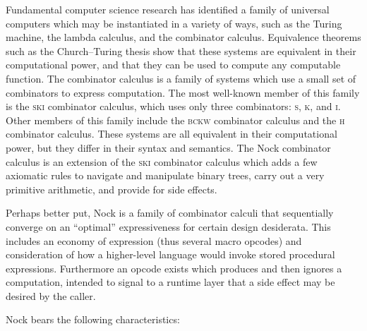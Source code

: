 \documentclass[twoside]{article}
\begin{document}
Fundamental computer science research has identified a family of universal computers which may be instantiated in a variety of ways, such as the Turing machine, the lambda calculus, and the combinator calculus.  Equivalence theorems such as the Church–Turing thesis show that these systems are equivalent in their computational power, and that they can be used to compute any computable function.  The combinator calculus is a family of systems which use a small set of combinators to express computation.  The most well-known member of this family is the \textsc{ski} combinator calculus, which uses only three combinators: \textsc{s}, \textsc{k}, and \textsc{i}.  Other members of this family include the \textsc{bckw} combinator calculus and the \textsc{h} combinator calculus.  These systems are all equivalent in their computational power, but they differ in their syntax and semantics.  The Nock combinator calculus is an extension of the \textsc{ski} combinator calculus which adds a few axiomatic rules to navigate and manipulate binary trees, carry out a very primitive arithmetic, and provide for side effects.

Perhaps better put, Nock is a family of combinator calculi that sequentially converge on an ``optimal'' expressiveness for certain design desiderata.  This includes an economy of expression (thus several macro opcodes) and consideration of how a higher-level language would invoke stored procedural expressions.  Furthermore an opcode exists which produces and then ignores a computation, intended to signal to a runtime layer that a side effect may be desired by the caller.

Nock bears the following characteristics:
\end{document}
